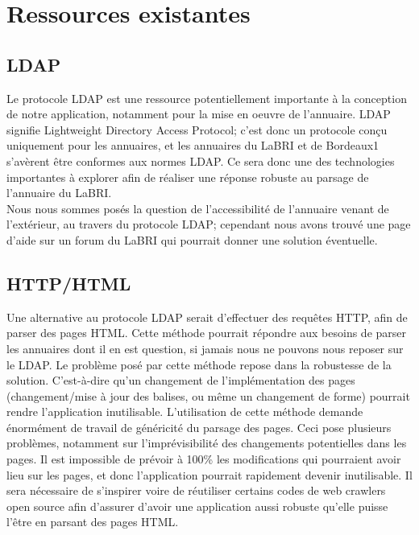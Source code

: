 \documentclass [pdftex,12pt] {report}
\begin{document}
\section{Ressources existantes}

\subsection{LDAP}
Le protocole LDAP est une ressource potentiellement importante à la conception de notre application, notamment pour la mise en oeuvre de l'annuaire. LDAP signifie Lightweight Directory Access Protocol; c'est donc un protocole conçu uniquement pour les annuaires, et les annuaires du LaBRI et de Bordeaux1 s'avèrent être conformes aux normes LDAP.
Ce sera donc une des technologies importantes à explorer afin de réaliser une réponse robuste au parsage de l'annuaire du LaBRI.\\
Nous nous sommes posés la question de l'accessibilité de l'annuaire venant de l'extérieur, au travers du protocole LDAP; cependant nous avons trouvé une page d'aide sur un forum du LaBRI\cite{labriForum} qui pourrait donner une solution éventuelle.

\subsection{HTTP/HTML}
Une alternative au protocole LDAP serait d'effectuer des requêtes HTTP, afin de parser des pages HTML. Cette méthode pourrait répondre aux besoins de parser les annuaires dont il en est question, si jamais nous ne pouvons nous reposer sur le LDAP. Le problème posé par cette méthode repose dans la robustesse de la solution. C'est-à-dire qu'un changement de l'implémentation des pages (changement/mise à jour des balises, ou même un changement de forme) pourrait rendre l'application inutilisable. L'utilisation de cette méthode demande énormément de travail de généricité du parsage des pages.
Ceci pose plusieurs problèmes, notamment sur l'imprévisibilité des changements potentielles dans les pages. Il est impossible de prévoir à 100\% les modifications qui pourraient avoir lieu sur les pages, et donc l'application pourrait rapidement devenir inutilisable. Il sera nécessaire de s'inspirer voire de réutiliser certains codes de web crawlers open source afin d'assurer d'avoir une application aussi robuste qu'elle puisse l'être en parsant des pages HTML.
\end{document}
